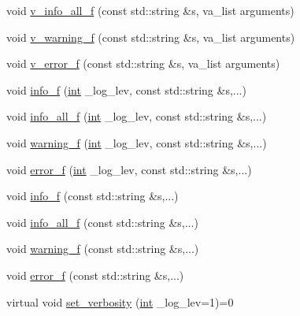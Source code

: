 \begin{DoxyCompactItemize}
void \hyperlink{classutils_1_1log_a908102971081fce062f52d1ebf8fb981}{v\-\_\-info\-\_\-all\-\_\-f} (const std\-::string \&s, va\-\_\-list arguments)
\item 
void \hyperlink{classutils_1_1log_abd427658297adae865c16adac9805e09}{v\-\_\-warning\-\_\-f} (const std\-::string \&s, va\-\_\-list arguments)
\item 
void \hyperlink{classutils_1_1log_aec43923f837343690dac8f19d8d6d283}{v\-\_\-error\-\_\-f} (const std\-::string \&s, va\-\_\-list arguments)
\item 
void \hyperlink{classutils_1_1log_a97344afe2171d9313e66fa3fd5126dbb}{info\-\_\-f} (\hyperlink{classint}{int} \-\_\-log\-\_\-lev, const std\-::string \&s,...)
\item 
void \hyperlink{classutils_1_1log_a6668474285440f7cb89cd013e7394aed}{info\-\_\-all\-\_\-f} (\hyperlink{classint}{int} \-\_\-log\-\_\-lev, const std\-::string \&s,...)
\item 
void \hyperlink{classutils_1_1log_a6f459ff550313048cae141dc07166a79}{warning\-\_\-f} (\hyperlink{classint}{int} \-\_\-log\-\_\-lev, const std\-::string \&s,...)
\item 
void \hyperlink{classutils_1_1log_ab0893a6983709de84a36c4531d91288f}{error\-\_\-f} (\hyperlink{classint}{int} \-\_\-log\-\_\-lev, const std\-::string \&s,...)
\item 
void \hyperlink{classutils_1_1log_aeeaf8a422c9774495e864f596ce6ce78}{info\-\_\-f} (const std\-::string \&s,...)
\item 
void \hyperlink{classutils_1_1log_af3bb68d31472695e6465236248c47079}{info\-\_\-all\-\_\-f} (const std\-::string \&s,...)
\item 
void \hyperlink{classutils_1_1log_ac07b5007d7071f1352246b62c5ac4aaf}{warning\-\_\-f} (const std\-::string \&s,...)
\item 
void \hyperlink{classutils_1_1log_ac2bc117516abba07b99cdd2c7ccb91f2}{error\-\_\-f} (const std\-::string \&s,...)
\item 
virtual void \hyperlink{classutils_1_1log_a3b35495ffd0a90f7be31bc54cb5c5f1e}{set\-\_\-verbosity} (\hyperlink{classint}{int} \-\_\-log\-\_\-lev=1)=0
\end{DoxyCompactItemize}


